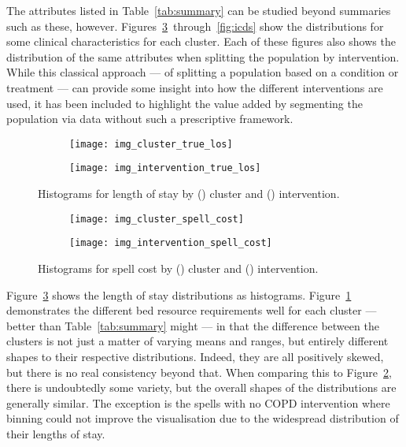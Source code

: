 \documentclass[11pt]{article}
\newlength{\imgwidth}
\begin{document}
The attributes listed in Table~\ref{tab:summary} can be studied beyond summaries
such as these, however. Figures~\ref{fig:los}~through~\ref{fig:icds} show the
distributions for some clinical characteristics for each cluster. Each of these
figures also shows the distribution of the same attributes when splitting the
population by intervention. While this classical approach --- of splitting a
population based on a condition or treatment --- can provide some insight into
how the different interventions are used, it has been included to highlight the
value added by segmenting the population via data without such a prescriptive
framework.

\begin{figure}
    \centering
    \begin{subfigure}{.5\imgwidth}
        \texttt{[image: img\_cluster\_true\_los]}
        \caption{}\label{fig:cluster_los}
    \end{subfigure}\hfill%
    \begin{subfigure}{.5\imgwidth}
        \texttt{[image: img\_intervention\_true\_los]}
        \caption{}\label{fig:intervention_los}
    \end{subfigure}
    \caption{%
        Histograms for length of stay by () cluster and
        () intervention.
    }\label{fig:los}
\end{figure}

\begin{figure}
    \centering
    \begin{subfigure}{.5\imgwidth}
        \texttt{[image: img\_cluster\_spell\_cost]}
        \caption{}\label{fig:cluster_cost}
    \end{subfigure}\hfill%
    \begin{subfigure}{.5\imgwidth}
        \texttt{[image: img\_intervention\_spell\_cost]}
        \caption{}\label{fig:intervention_cost}
    \end{subfigure}
    \caption{%
        Histograms for spell cost by () cluster and
        () intervention.
    }\label{fig:cost}
\end{figure}

Figure~\ref{fig:los} shows the length of stay distributions as histograms.
Figure~\ref{fig:cluster_los} demonstrates the different bed resource
requirements well for each cluster --- better than Table~\ref{tab:summary} might
--- in that the difference between the clusters is not just a matter of
varying means and ranges, but entirely different shapes to their respective
distributions. Indeed, they are all positively skewed, but there is no real
consistency beyond that. When comparing this to
Figure~\ref{fig:intervention_los}, there is undoubtedly some variety, but the
overall shapes of the distributions are generally similar. The exception is the
spells with no COPD intervention where binning could not improve the
visualisation due to the widespread distribution of their lengths of stay.
\end{document}
